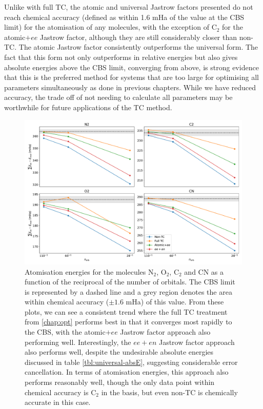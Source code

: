Unlike with full TC, the atomic and universal Jastrow factors presented do not reach chemical accuracy (defined as within 1.6 mHa of the value at the CBS limit) for the atomisation of any molecules, with the exception of C$_2$ for the atomic$+ee$ Jastrow factor, although they are still considerably closer than non-TC. The atomic Jastrow factor consistently outperforms the universal form. The fact that this form not only outperforms in relative energies but also gives absolute energies above the CBS limit, converging from above, is strong evidence that this is the preferred method for systems that are too large for optimising all parameters simultaneously as done in previous chapters. While we have reduced accuracy, the trade off of not needing to calculate all parameters may be worthwhile for future applications of the TC method.



\begin{figure}[htbp]
    \centering
    \includegraphics[width=\textwidth]{figures/universal/atomisation_energies}
    \caption{Atomisation energies for the molecules N$_2$, O$_2$, C$_2$ and CN as a function of the reciprocal of the number of orbitals. The CBS limit is represented by a dashed line and a grey region denotes the area within chemical accuracy ($\pm 1.6$ mHa) of this value. From these plots, we can see a consistent trend where the full TC treatment from \autoref{chap:opt} performs best in that it converges most rapidly to the CBS, with the atomic$+ee$ Jastrow factor approach also performing well. Interestingly, the $ee+en$ Jastrow factor approach also performs well, despite the undesirable absolute energies discussed in table \ref{tbl:universal-absE}, suggesting considerable error cancellation. In terms of atomisation energies, this approach also performs reasonably well, though the only data point within chemical accuracy is C$_2$ in the \vqz basis, but even non-TC is chemically accurate in this case.}
    \label{fig:universal-atomisation}
\end{figure}

